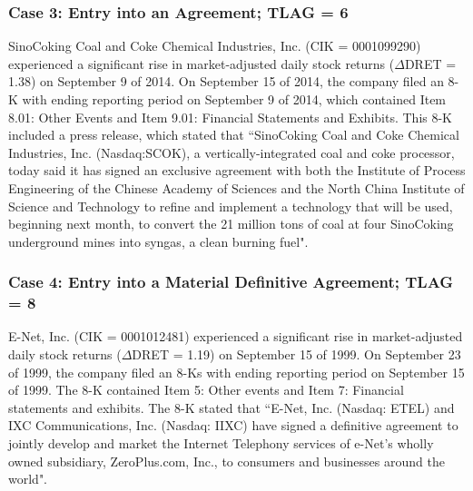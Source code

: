 \begin{small}
\subsubsection*{Case 3: Entry into an Agreement; TLAG = 6}
SinoCoking Coal and Coke Chemical Industries, Inc. (CIK = 0001099290) experienced a significant rise in market-adjusted daily stock returns ($\Delta$DRET = 1.38) on September 9 of 2014. On September 15 of 2014, the company filed an 8-K with ending reporting period on September 9 of 2014, which contained Item 8.01: Other Events and Item 9.01: Financial Statements and Exhibits. This 8-K included a press release, which stated that ``SinoCoking Coal and Coke Chemical Industries, Inc. (Nasdaq:SCOK), a vertically-integrated coal and coke processor, today said it has signed an exclusive agreement with both the Institute of Process Engineering of the Chinese Academy of Sciences and the North China Institute of Science and Technology to refine and implement a technology that will be used, beginning next month, to convert the 21 million tons of coal at four SinoCoking underground mines into syngas, a clean burning fuel".
\subsubsection*{Case 4: Entry into a Material Definitive Agreement; TLAG = 8}
E-Net, Inc. (CIK = 0001012481) experienced a significant rise in market-adjusted daily stock returns ($\Delta$DRET = 1.19) on September 15 of 1999. On September 23 of 1999, the company filed an 8-Ks with ending reporting period on September 15 of 1999. The 8-K contained Item 5: Other events and Item 7: Financial statements and exhibits. The 8-K stated that ``E-Net, Inc. (Nasdaq: ETEL) and IXC Communications, Inc. (Nasdaq: IIXC) have signed a definitive agreement to jointly develop and market the Internet Telephony services of e-Net's wholly owned subsidiary, ZeroPlus.com, Inc., to consumers and businesses around the world".

\end{small}
